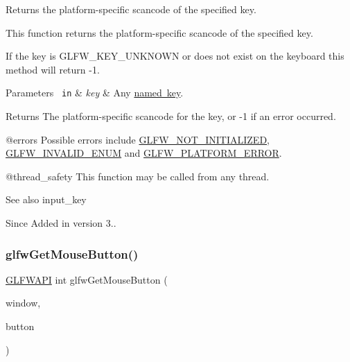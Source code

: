 Returns the platform-\/specific scancode of the specified key. 

This function returns the platform-\/specific scancode of the specified key.

If the key is {\ttfamily G\+L\+F\+W\+\_\+\+K\+E\+Y\+\_\+\+U\+N\+K\+N\+O\+WN} or does not exist on the keyboard this method will return {\ttfamily -\/1}.


\begin{DoxyParams}[1]{Parameters}
\mbox{\texttt{ in}}  & {\em key} & Any \mbox{\hyperlink{group__keys}{named key}}. \\
\hline
\end{DoxyParams}
\begin{DoxyReturn}{Returns}
The platform-\/specific scancode for the key, or {\ttfamily -\/1} if an error occurred.
\end{DoxyReturn}
@errors Possible errors include \mbox{\hyperlink{group__errors_ga2374ee02c177f12e1fa76ff3ed15e14a}{G\+L\+F\+W\+\_\+\+N\+O\+T\+\_\+\+I\+N\+I\+T\+I\+A\+L\+I\+Z\+ED}}, \mbox{\hyperlink{group__errors_ga76f6bb9c4eea73db675f096b404593ce}{G\+L\+F\+W\+\_\+\+I\+N\+V\+A\+L\+I\+D\+\_\+\+E\+N\+UM}} and \mbox{\hyperlink{group__errors_gad44162d78100ea5e87cdd38426b8c7a1}{G\+L\+F\+W\+\_\+\+P\+L\+A\+T\+F\+O\+R\+M\+\_\+\+E\+R\+R\+OR}}.

@thread\+\_\+safety This function may be called from any thread.

\begin{DoxySeeAlso}{See also}
input\+\_\+key
\end{DoxySeeAlso}
\begin{DoxySince}{Since}
Added in version 3.. 
\end{DoxySince}
\mbox{\label{group__input_ga6da5efb04f700c312a57a169fa9393a0}} 
\subsubsection{\texorpdfstring{glfwGetMouseButton()}{glfwGetMouseButton()}}
{\footnotesize\ttfamily \mbox{\hyperlink{glfw3_8h_a56da5036b2cc259351ae22fd6439bb47}{G\+L\+F\+W\+A\+PI}} int glfw\+Get\+Mouse\+Button (\begin{DoxyParamCaption}\item[{\mbox{\hyperlink{group__window_ga3c96d80d363e67d13a41b5d1821f3242}{G\+L\+F\+Wwindow}} $\ast$}]{window,  }\item[{int}]{button }\end{DoxyParamCaption})}



